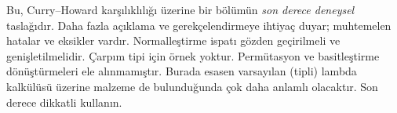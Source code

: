
\begin{editorial}
  Bu, Curry--Howard karşılıklılığı üzerine bir bölümün \emph{son derece
  deneysel} taslağıdır. Daha fazla açıklama ve gerekçelendirmeye ihtiyaç
  duyar; muhtemelen hatalar ve eksikler vardır. Normalleştirme ispatı gözden
  geçirilmeli ve genişletilmelidir. Çarpım tipi için örnek yoktur.
  Permütasyon ve basitleştirme dönüştürmeleri ele alınmamıştır. Burada esasen
  varsayılan (tipli) lambda kalkülüsü üzerine malzeme de bulunduğunda çok daha
  anlamlı olacaktır. Son derece dikkatli kullanın.
\end{editorial}
\OLEndChapterHook
